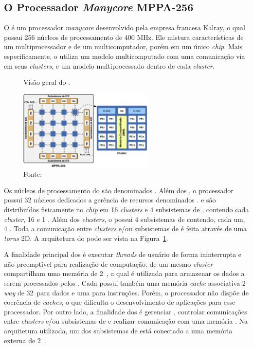 \subsection{O Processador \textit{Manycore} MPPA-256}
\label{sec:mppa}

O \mppa é um processador \textit{manycore} desenvolvido pela empresa francesa
Kalray, o qual possui 256 núcleos de processamento de 400 MHz. Ele mistura características
de um multiprocessador e de um multicomputador, porém em um único \textit{chip}.
Mais especificamente, o \mppa utiliza um modelo multicomputado com uma
comunicação via \noc em seus \textit{clusters}, e um modelo multiprocessado
dentro de cada \textit{cluster}.

\begin{figure}[t]
	\centering
	\caption{Visão geral do \mppa.}
	\includegraphics[width=0.6\textwidth]{figs/mppa-overall.pdf}
    \caption*{Fonte: ~\cite{Castro-IA3:2013}}
	\label{fig:mppa}
\end{figure}

Os núcleos de processamento do \mppa são denominados \pes.
Além dos \pes, o processador possui 32 núcleos dedicados a gerência de recursos
denominados  \rmans. \pes e \rmans são distribuídos
fisicamente no \textit{chip} em 16 \textit{clusters} e 4 subsistemas de \es,
contendo cada \textit{cluster}, 16 \pes e 1 \rman. Além dos \textit{clusters}, o
\mppa possui 4 subsistemas de \es contendo, cada um, 4 \rmans. Toda a comunicação
entre \textit{clusters} e/ou subsistemas de \es é feita através de uma \noc
\textit{torus} 2D. A arquitetura do \mppa pode ser vista na Figura~\ref{fig:mppa}.

A finalidade principal dos \pes é executar \textit{threads} de usuário de forma
ininterrupta e não preemptível para realização de computação. \pes de um mesmo
\textit{cluster} compartilham uma memória de 2~\mb, a qual é utilizada para
armazenar os dados a serem processados pelos \pes. Cada \pe possui também uma
memória \textit{cache} associativa 2-\textit{way} de 32~\kb para dados e uma para
instruções. Porém, o processador não dispõe de coerência de \textit{caches}, o
que dificulta o desenvolvimento de aplicações para esse processador. Por outro
lado, a finalidade dos \rmans é gerenciar \es, controlar comunicações entre
\textit{clusters} e/ou subsistemas de \es e realizar comunicação com uma memória
\ram. Na arquitetura utilizada, um dos subsistemas de \es está conectado a uma
memória externa \lpddr de 2~\gb.

